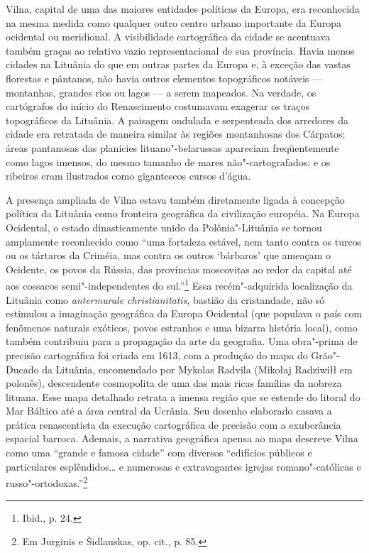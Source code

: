 Vilna, capital de uma das maiores entidades políticas da Europa, era
reconhecida na mesma medida como qualquer outro centro urbano importante
da Europa ocidental ou meridional. A visibilidade cartográfica da cidade
se acentuava também graças ao relativo vazio representacional de sua
província. Havia menos cidades na Lituânia do que em outras partes da
Europa e, à exceção das vastas florestas e pântanos, não havia outros
elementos topográficos notáveis --- montanhas, grandes rios ou lagos --- a
serem mapeados. Na verdade, os cartógrafos do início do Renascimento
costumavam exagerar os traços topográficos da Lituânia. A paisagem
ondulada e serpenteada dos arredores da cidade era retratada de maneira
similar às regiões montanhosas dos Cárpatos; áreas pantanosas das
planícies lituano"-belarussas apareciam freqüentemente como lagos
imensos, do mesmo tamanho de mares não"-cartografados; e os ribeiros eram
ilustrados como gigantescos cursos d'água.

A presença ampliada de Vilna estava também diretamente ligada à
concepção política da Lituânia como fronteira geográfica da civilização
européia. Na Europa Ocidental, o estado dinasticamente unido da
Polônia"-Lituânia se tornou amplamente reconhecido como ``uma fortaleza
estável, nem tanto contra os turcos ou os tártaros da Criméia, mas
contra os outros `bárbaros' que ameaçam o Ocidente, os povos da Rússia,
das províncias moscovitas ao redor da capital até aos cossacos
semi"-independentes do sul.''\footnote{Ibid., p. 24.} Essa
recém"-adquirida localização da Lituânia como \emph{antermurale
christianitatis}, bastião da cristandade, não só estimulou a imaginação
geográfica da Europa Ocidental (que populava o país com fenômenos
naturais exóticos, povos estranhos e uma bizarra história local), como
também contribuiu para a propagação da arte da geografia. Uma obra"-prima
de precisão cartográfica foi criada em 1613, com a produção do mapa do
Grão"-Ducado da Lituânia, encomendado por Mykolas Radvila (Mikołaj
Radziwiłł em polonês), descendente cosmopolita de uma das mais ricas
famílias da nobreza lituana. Esse mapa detalhado retrata a imensa região
que se estende do litoral do Mar Báltico até a área central da Ucrânia.
Seu desenho elaborado casava a prática renascentista da execução
cartográfica de precisão com a exuberância espacial barroca. Ademais, a
narrativa geográfica apensa ao mapa descreve Vilna como uma ``grande e
famosa cidade'' com diversos ``edifícios públicos e particulares
esplêndidos\ldots{} e numerosas e extravagantes igrejas romano"-católicas
e russo"-ortodoxas.''\footnote{Em Jurginis e Šidlauskas, op. cit., p. 85.}

